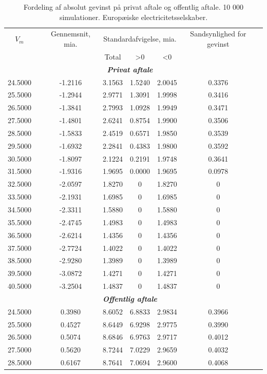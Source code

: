 \documentclass{article}
\begin{document}
\begin{table}[h]
	\caption{Fordeling af absolut gevinst p\aa{} privat aftale og offentlig aftale. 10 000 simulationer. Europæiske electricitetsselskaber.}
	\label{tab:abs_fordeling}
	\begin{tabularx}{0.95\linewidth}{cXcccccr}
	\toprule[1pt] 
	$V_m$ && Gennemsnit, mia. & \multicolumn{3}{c}{Standardafvigelse, mia.}  & Sandsynlighed for gevinst\\
	& & &Total & >0 & <0 \\
	\hline 
	\multicolumn{7}{c}{\emph{\textbf{Privat aftale}}} \\
24.5000&&-1.2116& 3.1563& 1.5240& 2.0045& 0.3376\\
25.5000&&-1.2944& 2.9771& 1.3091& 1.9998& 0.3416\\
26.5000&&-1.3841& 2.7993& 1.0928& 1.9949& 0.3471\\
27.5000&&-1.4801& 2.6241& 0.8754& 1.9900& 0.3506\\
28.5000&&-1.5833& 2.4519& 0.6571& 1.9850& 0.3539\\
29.5000&&-1.6932& 2.2841& 0.4383& 1.9800& 0.3592\\
30.5000&&-1.8097& 2.1224& 0.2191& 1.9748& 0.3641\\
31.5000&&-1.9316& 1.9695& 0.0000& 1.9695& 0.0978\\
32.5000&&-2.0597& 1.8270&0& 1.8270&0\\
33.5000&&-2.1931& 1.6985&0& 1.6985&0\\
34.5000&&-2.3311& 1.5880&0& 1.5880&0\\
35.5000&&-2.4745& 1.4983&0& 1.4983&0\\
36.5000&&-2.6214& 1.4356&0& 1.4356&0\\
37.5000&&-2.7724& 1.4022&0& 1.4022&0\\
38.5000&&-2.9280& 1.3989&0& 1.3989&0\\
39.5000&&-3.0872& 1.4271&0& 1.4271&0\\
40.5000&&-3.2504& 1.4837&0& 1.4837&0\\
\multicolumn{7}{c}{\emph{\textbf{Offentlig aftale}}} \\
 24.5000&&0.3980&8.6052&6.8833&2.9834&0.3966 \\
 25.5000&&0.4527&8.6449&6.9298&2.9775&0.3990\\
 26.5000&&0.5074&8.6846&6.9763&2.9717&0.4012\\
 27.5000&&0.5620&8.7244&7.0229&2.9659&0.4032\\
 28.5000&&0.6167&8.7641&7.0694&2.9600&0.4068\\

\end{tabularx}
\end{table}
\end{document}
